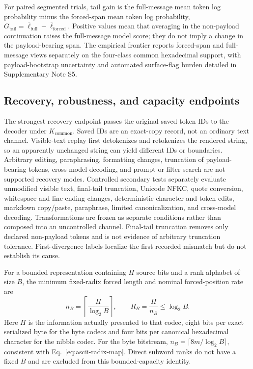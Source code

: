 \documentclass[fleqn,10pt]{wlscirep}
\begin{document}
For paired segmented trials, tail gain is the full-message mean token log probability minus the forced-span mean token log probability, \(G_{\mathrm{tail}}=\bar\ell_{\mathrm{full}}-\bar\ell_{\mathrm{forced}}\). Positive values mean that averaging in the non-payload continuation raises the full-message model score; they do not imply a change in the payload-bearing span. The empirical frontier reports forced-span and full-message views separately on the four-class common hexadecimal support, with payload-bootstrap uncertainty and automated surface-flag burden detailed in Supplementary Note S5.

\subsection*{Recovery, robustness, and capacity endpoints}\label{sec:replay-method}\label{sec:capacity-method}\label{sec:endpoint-method}

The strongest recovery endpoint passes the original saved token IDs to the decoder under \(K_{\mathrm{common}}\). Saved IDs are an exact-copy record, not an ordinary text channel. Visible-text replay first detokenizes and retokenizes the rendered string, so an apparently unchanged string can yield different IDs or boundaries\cite{YanMurawaki2025TokenizationInconsistency}. Arbitrary editing, paraphrasing, formatting changes, truncation of payload-bearing tokens, cross-model decoding, and prompt or filter search are not supported recovery modes.
Controlled secondary tests separately evaluate unmodified visible text, final-tail truncation, Unicode NFKC, quote conversion, whitespace and line-ending changes, deterministic character and token edits, markdown copy/paste, paraphrase, limited canonicalization, and cross-model decoding. Transformations are frozen as separate conditions rather than composed into an uncontrolled channel. Final-tail truncation removes only declared non-payload tokens and is not evidence of arbitrary truncation tolerance. First-divergence labels localize the first recorded mismatch but do not establish its cause.

For a bounded representation containing \(H\) source bits and a rank alphabet of size \(B\), the minimum fixed-radix forced length and nominal forced-position rate are
\begin{equation}
n_B=\left\lceil\frac{H}{\log_2B}\right\rceil,
\qquad
R_B=\frac{H}{n_B}\le\log_2B.
\label{eq:capacity}
\end{equation}
Here \(H\) is the information actually presented to that codec, eight bits per exact serialized byte for the byte codecs and four bits per canonical hexadecimal character for the nibble codec. For the byte bitstream, \(n_B=\lceil8m/\log_2B\rceil\), consistent with Eq.~\eqref{eq:ascii-radix-map}. Direct subword ranks do not have a fixed \(B\) and are excluded from this bounded-capacity identity.
\end{document}
